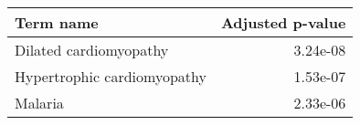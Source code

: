 \begin{tabular}{lr}
\toprule
                  Term name &  Adjusted p-value \\
\midrule
     Dilated cardiomyopathy &          3.24e-08 \\
Hypertrophic cardiomyopathy &          1.53e-07 \\
                    Malaria &          2.33e-06 \\
\bottomrule
\end{tabular}
